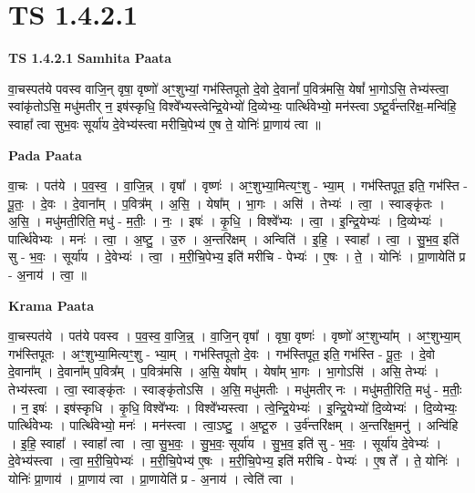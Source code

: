\documentclass[17pt]{extarticle}
\begin{document}
\section*{ TS 1.4.2.1 }

\textbf{TS 1.4.2.1 } \newline
\textbf{Samhita Paata} \newline

वा॒चस्पत॑ये पवस्व वाजि॒न् वृषा॒ वृष्णो॑ अꣳ॒॒शुभ्यां॒ गभ॑स्तिपूतो दे॒वो दे॒वानां᳚ प॒वित्र॑मसि॒ येषां᳚ भा॒गोऽसि॒ तेभ्य॑स्त्वा॒ स्वांकृ॑तोऽसि॒ मधु॑मतीर् न॒ इष॑स्कृधि॒ विश्वे᳚भ्यस्त्वेन्द्रि॒येभ्यो॑ दि॒व्येभ्यः॒ पार्त्थि॑वेभ्यो॒ मन॑स्त्वा ऽष्टू॒र्व॑न्तरि॑क्ष॒-मन्वि॑हि॒ स्वाहा᳚ त्वा सुभ॒वः सूर्या॑य दे॒वेभ्य॑स्त्वा मरीचि॒पेभ्य॑ ए॒ष ते॒ योनिः॑ प्रा॒णाय॑ त्वा ॥ \newline

\textbf{Pada Paata} \newline

वा॒चः । पत॑ये । प॒व॒स्व॒ । वा॒जि॒न्न् । वृषा᳚ । वृष्णः॑ । अꣳ॒॒शुभ्या॒मित्यꣳ॒॒शु - भ्या॒म् । गभ॑स्तिपूत॒ इति॒ गभ॑स्ति - पू॒तः॒ । दे॒वः । दे॒वाना᳚म् । प॒वित्र᳚म् । अ॒सि॒ । येषा᳚म् । भा॒गः । असि॑ । तेभ्यः॑ । त्वा॒ । स्वाङ्कृ॑तः । अ॒सि॒ । मधु॑मती॒रिति॒ मधु॑ - म॒तीः॒ । नः॒ । इषः॑ । कृ॒धि॒ । विश्वे᳚भ्यः । त्वा॒ । इ॒न्द्रि॒येभ्यः॑ । दि॒व्येभ्यः॑ । पार्त्थि॑वेभ्यः । मनः॑ । त्वा॒ । अ॒ष्टु॒ । उ॒रु । अ॒न्तरि॑क्षम् । अन्विति॑ । इ॒हि॒ । स्वाहा᳚ । त्वा॒ । सु॒भ॒व॒ इति॑ सु - भ॒वः॒ । सूर्या॑य । दे॒वेभ्यः॑ । त्वा॒ । म॒री॒चि॒पेभ्य॒ इति॑ मरीचि - पेभ्यः॑ । ए॒षः । ते॒ । योनिः॑ । प्रा॒णायेति॑ प्र - अ॒नाय॑ । त्वा॒ ॥  \newline


\textbf{Krama Paata} \newline

वा॒चस्पत॑ये । पत॑ये पवस्व । प॒व॒स्व॒ वा॒जि॒न्न्॒ । वा॒जि॒न् वृषा᳚ । वृषा॒ वृष्णः॑ । वृष्णो॑ अꣳ॒॒शुभ्या᳚म् । अꣳ॒॒शुभ्या॒म् गभ॑स्तिपूतः । अꣳ॒॒शुभ्या॒मित्यꣳ॒॒शु - भ्या॒म् । गभ॑स्तिपूतो दे॒वः । गभ॑स्तिपूत॒ इति॒ गभ॑स्ति - पू॒तः॒ । दे॒वो दे॒वाना᳚म् । दे॒वाना᳚म् प॒वित्र᳚म् । प॒वित्र॑मसि । अ॒सि॒ येषा᳚म् । येषा᳚म् भा॒गः । भा॒गोऽसि॑ । असि॒ तेभ्यः॑ । तेभ्य॑स्त्वा । त्वा॒ स्वाङ्कृ॑तः । स्वाङ्कृ॑तोऽसि । अ॒सि॒ मधु॑मतीः । मधु॑मतीर् नः । मधु॑मती॒रिति॒ मधु॑ - म॒तीः॒ । न॒ इषः॑ । इष॑स्कृधि । कृ॒धि॒ विश्वे᳚भ्यः । विश्वे᳚भ्यस्त्वा । त्वे॒न्द्रि॒येभ्यः॑ । इ॒न्द्रि॒येभ्यो॑ दि॒व्येभ्यः॑ । दि॒व्येभ्यः॒ पार्त्थि॑वेभ्यः । पार्त्थि॑वेभ्यो॒ मनः॑ । मन॑स्त्वा । त्वा॒ऽष्टु॒ । अ॒ष्टू॒रु । उ॒र्व॑न्तरि॑क्षम् । अ॒न्तरि॑क्ष॒मनु॑ । अन्वि॑हि । इ॒हि॒ स्वाहा᳚ । स्वाहा᳚ त्वा । त्वा॒ सु॒भ॒वः॒ । सु॒भ॒वः॒ सूर्या॑य । सु॒भ॒व॒ इति॑ सु - भ॒वः॒ । सूर्या॑य दे॒वेभ्यः॑ । दे॒वेभ्य॑स्त्वा । त्वा॒ म॒री॒चि॒पेभ्यः॑ । म॒री॒चि॒पेभ्य॑ ए॒षः । म॒री॒चि॒पेभ्य॒ इति॑ मरीचि - पेभ्यः॑ । ए॒ष ते᳚ । ते॒ योनिः॑ । योनिः॑ प्रा॒णाय॑ । प्रा॒णाय॑ त्वा । प्रा॒णायेति॑ प्र - अ॒नाय॑ । त्वेति॑ त्वा । \newline
\end{document}
